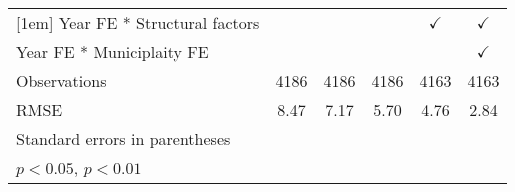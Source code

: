 \begin{table}[htbp]
\begin{tabular}{l*{5}{c}}
[1em]
Year FE * Structural factors&                    &                    &                    &$\checkmark$        &$\checkmark$        \\
[1em]
Year FE * Municiplaity FE&                    &                    &                    &                    &$\checkmark$        \\
\hline
Observations        &        4186        &        4186        &        4186        &        4163        &        4163        \\
RMSE                &        8.47        &        7.17        &        5.70        &        4.76        &        2.84        \\
\hline\hline
\multicolumn{6}{l}{\footnotesize Standard errors in parentheses}\\
\multicolumn{6}{l}{\footnotesize \sym{*} \(p<0.05\), \sym{**} \(p<0.01\)}\\
\end{tabular}
\end{table}
